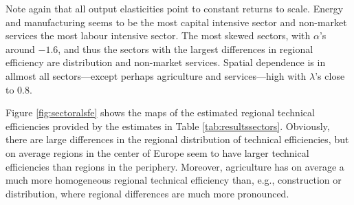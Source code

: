 \documentclass[11pt,parskip,abstracton,notitlepage]{scrartcl}
\begin{document}
%
Note again that all output elasticities point to constant returns to scale. Energy and manufacturing seems to be the most capital intensive sector and non-market services the most labour intensive sector. The most skewed sectors, with $\alpha$'s around $-1.6$, and thus the sectors with the largest differences in regional efficiency are distribution and non-market services. Spatial dependence is in allmost all sectors---except perhaps agriculture and services---high with $\lambda$'s close to 0.8.

Figure \ref{fig:sectoralsfe} shows the maps of the estimated regional technical
efficiencies provided by the estimates in Table \ref{tab:resultssectors}.
Obviously, there are large differences in the regional distribution of technical
efficiencies, but on average regions in the center of Europe seem to have larger
technical efficiencies than regions in the periphery. Moreover, agriculture has
on average a much more homogeneous regional technical efficiency than, e.g.,
construction or distribution, where regional differences are much more pronounced. 
\end{document}
